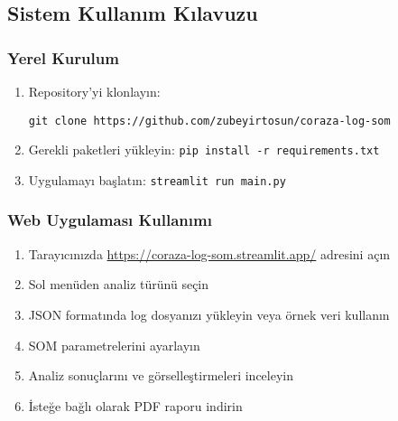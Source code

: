 \newpage

\subsection{Sistem Kullanım Kılavuzu}

\subsubsection{Yerel Kurulum}
\begin{enumerate}
    \item Repository'yi klonlayın: 
    
    \texttt{git clone https://github.com/zubeyirtosun/coraza-log-som}
    \item Gerekli paketleri yükleyin: \texttt{pip install -r requirements.txt}
    \item Uygulamayı başlatın: \texttt{streamlit run main.py}
\end{enumerate}

\subsubsection{Web Uygulaması Kullanımı}
\begin{enumerate}
    \item Tarayıcınızda \url{https://coraza-log-som.streamlit.app/} adresini açın
    \item Sol menüden analiz türünü seçin
    \item JSON formatında log dosyanızı yükleyin veya örnek veri kullanın
    \item SOM parametrelerini ayarlayın
    \item Analiz sonuçlarını ve görselleştirmeleri inceleyin
    \item İsteğe bağlı olarak PDF raporu indirin
\end{enumerate} 